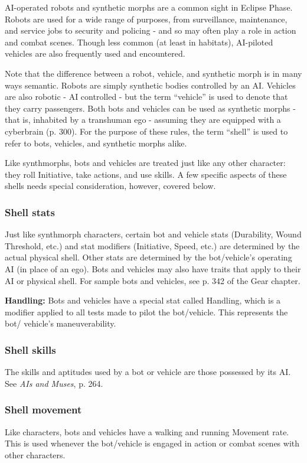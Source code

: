 AI-operated robots and synthetic morphs are a common sight in Eclipse Phase. Robots are used for a wide range of purposes, from surveillance, maintenance, and service jobs to security and policing -  and so may often play a role in action and combat scenes. Though less common (at least in habitats), AI-piloted vehicles are also frequently used and encountered.

Note that the difference between a robot, vehicle, and synthetic morph is in many ways semantic. Robots are simply synthetic bodies controlled by an AI. Vehicles are also robotic - AI controlled -  but the term ``vehicle'' is used to denote that they carry passengers. Both bots and vehicles can be used as synthetic morphs -  that is, inhabited by a transhuman ego -  assuming they are equipped with a cyberbrain (p. 300). For the purpose of these rules, the term ``shell'' is used to refer to bots, vehicles, and synthetic morphs alike.

Like synthmorphs, bots and vehicles are treated just like any other character: they roll Initiative, take actions, and use skills. A few specific aspects of these shells needs special consideration, however, covered below.

\subsubsection{Shell stats}
Just like synthmorph characters, certain bot and vehicle stats (Durability, Wound Threshold, etc.) and stat modifiers (Initiative, Speed, etc.) are determined by the actual physical shell. Other stats are determined by the bot/vehicle’s operating AI (in place of an ego). Bots and vehicles may also have traits that apply to their AI or physical shell. For sample bots and vehicles, see p. 342 of the Gear chapter.

\textbf{Handling:} Bots and vehicles have a special stat called Handling, which is a modifier applied to all tests made to pilot the bot/vehicle. This represents the bot/ vehicle’s maneuverability.

\subsubsection{Shell skills}
The skills and aptitudes used by a bot or vehicle are those possessed by its AI. See \emph{AIs and Muses}, p. 264.

\subsubsection{Shell movement}
Like characters, bots and vehicles have a walking and running Movement rate. This is used whenever the bot/vehicle is engaged in action or combat scenes with other characters.

